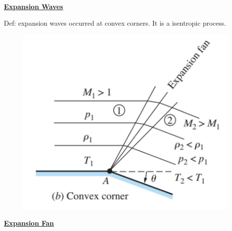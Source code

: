 \textbf{{\color{blue}\underline{Expansion Waves}}}

Def: expansion waves occurred at convex corners. It is a {\color{red}isentropic} process.
\begin{figure}[H]
    \centering
    \includegraphics[width=1.0\linewidth]{images/expansion_wave_convex.png}
\end{figure}

\textbf{\large {\color{red}\underline{Expansion Fan}}}

